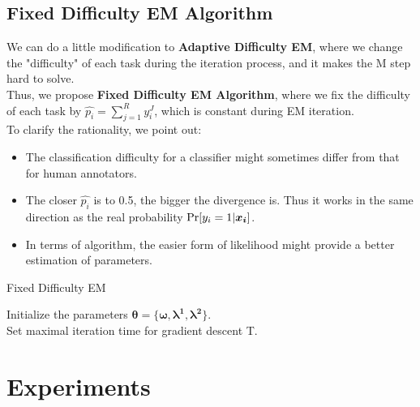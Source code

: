 \documentclass{article}
\begin{document}
\subsection{Fixed Difficulty EM Algorithm}
We can do a little modification to \textbf{Adaptive Difficulty EM}, where we change the "difficulty" of each task during the iteration process, and it makes the M step hard to solve. \\
Thus, we propose \textbf{Fixed Difficulty EM Algorithm}, where we fix the difficulty of each task by $\hat{p_i}=\sum_{j=1}^R y_i^J$, which is constant during EM iteration.\\ To clarify the rationality, we point out:
\begin{itemize}
    \item The classification difficulty for a classifier might sometimes differ from that for human annotators.
    \item The closer $\hat{p_i}$ is to 0.5, the bigger the divergence is. Thus it works in the same direction as the real probability $\textup{Pr}[y_i=1|\bm{x_i}]$.
    \item In terms of algorithm, the easier form of likelihood might provide a better estimation of parameters.
\end{itemize} 

\begin{algorithm}
    \caption{Fixed Difficulty EM}
    Initialize the parameters $\bm{\theta}=\lbrace \bm{\omega,\lambda^1,\lambda^2}\}$.\\
    Set maximal iteration time for gradient descent T.\\
\end{algorithm}
\section{Experiments}

\end{document}
